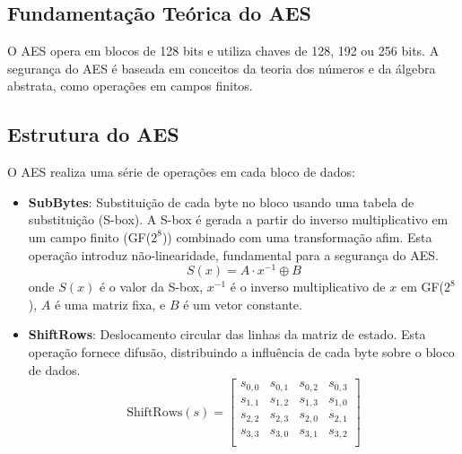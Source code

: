 \documentclass[a4paper,12pt]{article}
\begin{document}
\subsection*{Fundamentação Teórica do AES}

O AES opera em blocos de 128 bits e utiliza chaves de 128, 192 ou 256 bits. A segurança do AES é baseada em conceitos da teoria dos números e da álgebra abstrata, como operações em campos finitos.

\subsection*{Estrutura do AES}

O AES realiza uma série de operações em cada bloco de dados:

\begin{itemize}
    \item \textbf{SubBytes}: Substituição de cada byte no bloco usando uma tabela de substituição (S-box). A S-box é gerada a partir do inverso multiplicativo em um campo finito (GF($2^8$)) combinado com uma transformação afim. Esta operação introduz não-linearidade, fundamental para a segurança do AES.
    \[
    S(x) = A \cdot x^{-1} \oplus B
    \]
    onde $S(x)$ é o valor da S-box, $x^{-1}$ é o inverso multiplicativo de $x$ em GF($2^8$), $A$ é uma matriz fixa, e $B$ é um vetor constante.

    \item \textbf{ShiftRows}: Deslocamento circular das linhas da matriz de estado. Esta operação fornece difusão, distribuindo a influência de cada byte sobre o bloco de dados.
    \[
    \text{ShiftRows}(s) = \begin{bmatrix}
    s_{0,0} & s_{0,1} & s_{0,2} & s_{0,3} \\
    s_{1,1} & s_{1,2} & s_{1,3} & s_{1,0} \\
    s_{2,2} & s_{2,3} & s_{2,0} & s_{2,1} \\
    s_{3,3} & s_{3,0} & s_{3,1} & s_{3,2} \\
    \end{bmatrix}
    \]


\end{itemize}
\end{document}
